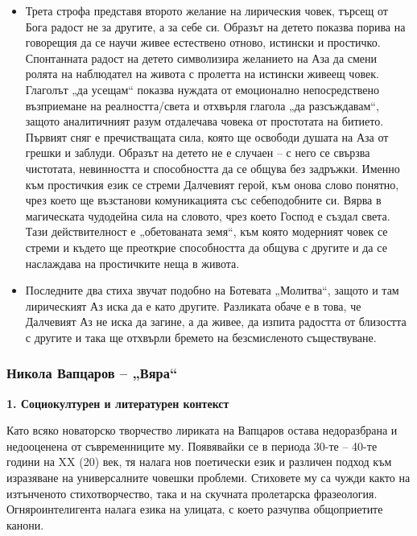 \documentclass[12pt,a4paper]{article}
\begin{document}
\begin{itemize}[leftmargin=*]
\vspace{-0.7cm}
\item Трета строфа представя второто желание на лирическия човек, търсещ от Бога радост не за другите, а за себе си. Образът на детето показва порива на говорещия да се научи живее естествено отново, истински и простичко. Спонтанната радост на детето символизира желанието на Аза да смени ролята на наблюдател на живота с пролетта на истински живеещ човек. Глаголът „да усещам“ показва нуждата от емоционално непосредствено възприемане на реалността/света и отхвърля глагола „да разсъждавам“, защото аналитичният разум отдалечава човека от простотата на битието. Първият сняг е пречистващата сила, която ще освободи душата на Аза от грешки и заблуди. Образът на детето не е случаен – с него се свързва чистотата, невинността и способността да се общува без задръжки. Именно към простичкия език се стреми Далчевият герой, към онова слово понятно, чрез което ще възстанови комуникацията със себеподобните си. Вярва в магическата чудодейна сила на словото, чрез което Господ е създал света. Тази действителност е „обетованата земя“, към която модерният човек се стреми и където ще преоткрие способността да общува с другите и да се наслаждава на простичките неща в живота.
\end{itemize}
 
\begin{itemize}[leftmargin=*]
\vspace{-0.7cm}
\item Последните два стиха звучат подобно на Ботевата „Молитва“, защото и там лирическият Аз иска да е като другите. Разликата обаче е в това, че Далчевият Аз не иска да загине, а да живее, да изпита радостта от близостта с другите и така ще отхвърли бремето на безсмисленото съществуване. 
\end{itemize}
\newpage

\subsubsection{\colorbox{green!40}{Никола Вапцаров – „Вяра“}}

\textbf{1. Социокултурен и литературен контекст}
\vspace{0.1cm}
 
\indent Като всяко новаторско творчество лириката на Вапцаров остава недоразбрана и недооценена от съвременниците му. Появявайки се в периода 30-те – 40-те години на XX (20) век, тя налага нов поетически език и различен подход към изразяване на универсалните човешки проблеми. Стиховете му са чужди както на изтънченото стихотворчество, така и на скучната пролетарска фразеология. Огняроинтелигента налага езика на улицата, с което разчупва общоприетите канони.
\end{document}
